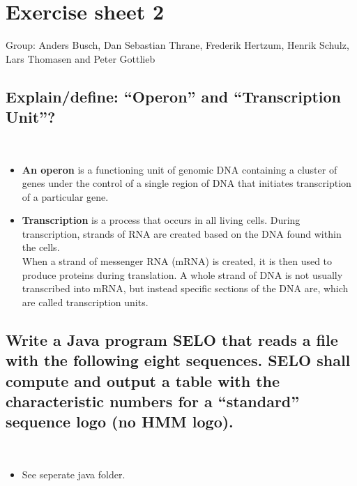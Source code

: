 \documentclass[a4paper,10pt,titlepage]{article}
\begin{document}
\section*{Exercise sheet 2}

Group: Anders Busch, Dan Sebastian Thrane, Frederik Hertzum, Henrik Schulz, Lars Thomasen and Peter Gottlieb

\subsection*{Explain/define: “Operon” and “Transcription Unit”?}\\

\begin{itemize}
\item
\textbf{An operon} is a functioning unit of genomic DNA containing a cluster of genes under the control of a single region of DNA that initiates transcription of a particular gene. 
\item
\textbf{Transcription} is a process that occurs in all living cells. During transcription, strands of RNA are created based on the DNA found within the cells. \\
When a strand of messenger RNA (mRNA) is created, it is then used to produce proteins during translation. A whole strand of DNA is not usually transcribed into mRNA, but instead specific sections of the DNA are, which are called transcription units.
\end{itemize}

\subsection*{Write a Java program SELO that reads a file with the following eight sequences. SELO shall compute and output a table with the characteristic numbers for a “standard” sequence logo (no HMM logo).}\\

\begin{itemize}
\item
See seperate java folder.
\end{itemize}

\end{document}
